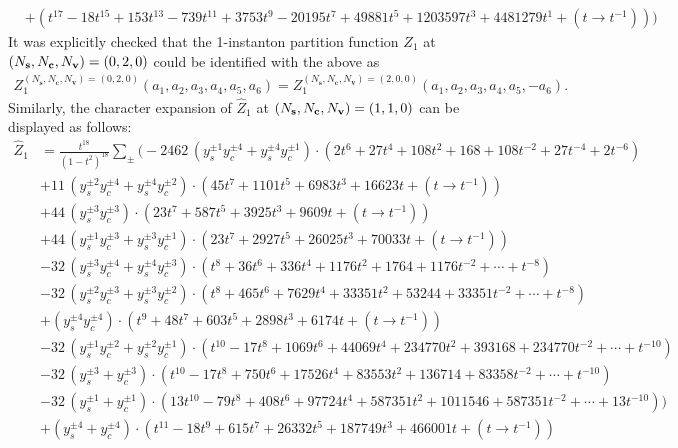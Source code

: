\documentclass[letterpaper, 11pt]{article}
\newcommand{\nn}{\nonumber}
\begin{document}
{\begin{align}
  &+(t^{17}-18t^{15}+153t^{13}-739t^{11}+3753t^9-20195t^{7}+49881t^{5}+1203597t^{3}+4481279t^{1}+(t\rightarrow t^{-1}))\Big)\nn
\end{align}
It was explicitly checked that the 1-instanton partition function $Z_1$ at $(N_{\bf s},N_{\bf c}, N_{\bf v}) = (0,2,0)$ could be identified with the above as
\begin{align}
  {Z}_{1}^{(N_{\mathbf{s}},N_\mathbf{c},N_{\mathbf{v}}) = (0,2,0)}(a_1,a_2,a_3,a_4,a_5,a_6) = {Z}_{1}^{(N_{\mathbf{s}},N_\mathbf{c},N_{\mathbf{v}}) = (2,0,0)}(a_1,a_2,a_3,a_4,a_5,-a_6).
\end{align}
Similarly, the character expansion of $\hat{Z}_1$ at $(N_{\bf s},N_{\bf c}, N_{\bf v}) = (1,1,0)$ can be displayed as follows:
\begin{align}
  \label{eq:so12-s1c1}
  \hat{Z}_1&=\frac{t^{18}}{(1-t^2)^{18}}\sum_{\pm}\Big(
  -2462\,(y_s^{\pm1}y_c^{\pm4}+y_s^{\pm4}y_c^{\pm1})\cdot{(2t^6+27t^4+108t^2+168+108t^{-2}+27t^{-4}+2t^{-6})}\nn\\
  &+11\,(y_s^{\pm2}y_c^{\pm4}+y_s^{\pm4}y_c^{\pm2})\cdot{(45t^7+1101t^5+6983t^3+16623t+ (t\rightarrow t^{-1}))}\nn\\
  &+44\,(y_s^{\pm3}y_c^{\pm3})\cdot{(23t^7+587t^5+3925t^3+9609t+ (t\rightarrow t^{-1}))}\\
  &+44\,(y_s^{\pm1}y_c^{\pm3}+y_s^{\pm3}y_c^{\pm1})\cdot{(23t^7+2927t^5+26025t^3+70033t+(t\rightarrow t^{-1}))}\nn\\
  &-32\,(y_s^{\pm3}y_c^{\pm4}+y_s^{\pm4}y_c^{\pm3})\cdot{(t^8+36t^6+336t^4+1176t^2+1764+1176t^{-2}+\cdots+t^{-8})}\nn\\
  &-32\,(y_s^{\pm2}y_c^{\pm3}+y_s^{\pm3}y_c^{\pm2})\cdot{(t^8+465t^6+7629t^4+33351t^2+53244+33351t^{-2}+\cdots+t^{-8})}\nn\\
  &+(y_s^{\pm4}y_c^{\pm4})\cdot {(t^9+48t^7+603t^5+2898t^3+6174t+(t\rightarrow t^{-1}))}\nn\\
  &-32\,(y_s^{\pm1}y_c^{\pm2}+y_s^{\pm2}y_c^{\pm1})\cdot (t^{10}-17t^8+1069t^6+44069t^4+234770t^2+393168+234770t^{-2} +\cdots+t^{-10})\nn\\
  &-32\,(y_s^{\pm3}+y_c^{\pm3})\cdot{(t^{10}-17t^8+750t^6+17526t^4+83553t^2+136714+83358t^{-2}+\cdots+t^{-10})}\nn\\
  &-32\,(y_s^{\pm1}+y_c^{\pm1})\cdot (13t^{10}-79t^8+408t^6+97724t^4+587351t^2+1011546+587351t^{-2}+\cdots +13t^{-10}))\nn\\
  &+(y_s^{\pm4}+y_c^{\pm4})\cdot{(t^{11}-18t^9+615t^7+26332t^5+187749t^3+466001t+(t\rightarrow t^{-1}))}\nn\\

\end{align}}
\end{document}
